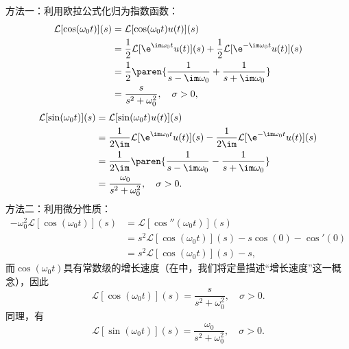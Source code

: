 \begin{example}[正弦、余弦函数]
    方法一：利用欧拉公式化归为指数函数：
    \begin{align}
        \mathcal{L}[\cos(\omega_0 t)](s)&=\mathcal{L}[\cos(\omega_0 t)u(t)](s)\nonumber\\
        &=\frac{1}{2}\mathcal{L}[\e^{\im\omega_0 t}u(t)](s)+\frac{1}{2}\mathcal{L}[\e^{-\im\omega_0 t}u(t)](s)\nonumber\\
        &=\frac{1}{2}\paren{\frac{1}{s-\im\omega_0}+\frac{1}{s+\im\omega_0}}\nonumber\\
        &=\frac{s}{s^2+\omega_0^2},\quad \sigma>0,
    \end{align}
    \begin{align}
        \mathcal{L}[\sin(\omega_0 t)](s)&=\mathcal{L}[\sin(\omega_0 t)u(t)](s)\nonumber\\
        &=\frac{1}{2\im}\mathcal{L}[\e^{\im\omega_0 t}u(t)](s)-\frac{1}{2\im}\mathcal{L}[\e^{-\im\omega_0 t}u(t)](s)\nonumber\\
        &=\frac{1}{2\im}\paren{\frac{1}{s-\im\omega_0}-\frac{1}{s+\im\omega_0}}\nonumber\\
        &=\frac{\omega_0}{s^2+\omega_0^2},\quad \sigma>0.
    \end{align}
    方法二：利用微分性质：
    \begin{align}
        -\omega_0^2\mathcal{L}[\cos(\omega_0 t)](s)&=\mathcal{L}[\cos''(\omega_0 t)](s)\nonumber\\
        &=s^2\mathcal{L}[\cos(\omega_0 t)](s)-s\cos(0)-\cos'(0)\nonumber\\
        &=s^2\mathcal{L}[\cos(\omega_0 t)](s)-s,
    \end{align}
    而$\cos(\omega_0 t)$具有常数级的增长速度（在中，我们将定量描述“增长速度”这一概念），因此
    \begin{equation}
        \mathcal{L}[\cos(\omega_0 t)](s)=\frac{s}{s^2+\omega_0^2},\quad \sigma>0.
    \end{equation}
    同理，有
    \begin{equation}
        \mathcal{L}[\sin(\omega_0 t)](s)=\frac{\omega_0}{s^2+\omega_0^2},\quad \sigma>0.
    \end{equation}
\end{example}

